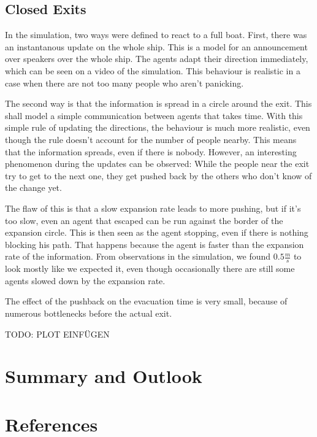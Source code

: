 \documentclass[11pt]{article}
\begin{document}
\subsection{Closed Exits} %
\label{sub:Closed exits}

In the simulation, two ways were defined to react to a full boat.  First, there
was an instantanous update on the whole ship.  This is a model for an
announcement over speakers over the whole ship.  The agents adapt their
direction immediately, which can be seen on a video of the simulation.  This
behaviour is realistic in a case when there are not too many people who aren't
panicking.

The second way is that the information is spread in a circle around the exit.
This shall model a simple communication between agents that takes time.  With
this simple rule of updating the directions, the behaviour is much more
realistic, even though the rule doesn't account for the number of people
nearby.  This means that the information spreads, even if there is nobody.
However, an interesting phenomenon during the updates can be observed:  While
the people near the exit try to get to the next one, they get pushed back by
the others who don't know of the change yet.

The flaw of this is that a slow expansion rate leads to more pushing, but if
it's too slow, even an agent that escaped can be run against the border of the
expansion circle.  This is then seen as the agent stopping, even if there is
nothing blocking his path. That happens because the agent is faster than the
expansion rate of the information. From observations in the simulation, we
found \(0.5\frac{m}{s}\) to look mostly like we expected it, even though
occasionally there are still some agents slowed down by the expansion rate.

The effect of the pushback on the evacuation time is very small, because of
numerous bottlenecks before the actual exit.

TODO: PLOT EINFÜGEN


\section{Summary and Outlook}

\section{References}

\end{document}
